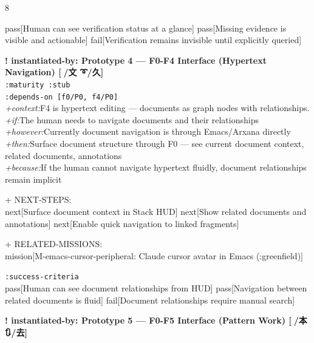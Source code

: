 \documentclass[landscape]{article}
\newcommand{\flexitag}[1]{\textcolor[gray]{0.35}{\textit{#1}}}
\newenvironment{devmapstub}{%
  \def\FrameCommand{\colorbox{devmapstubbg}}%
  \setlength{\fboxsep}{2pt}%
  \MakeFramed{\advance\hsize-\width \FrameRestore}%
}{\endMakeFramed}
\begin{document}
\begin{paracol}{8}
\begin{devmapstub}
    pass[Human can see verification status at a glance] pass[Missing evidence is visible and actionable] fail[Verification remains invisible until explicitly queried]\\
\par
\par
\end{devmapstub}
\begin{devmapstub}
\textbf{! instantiated-by: Prototype 4 — F0-F4 Interface (Hypertext Navigation) [📁/文 ➰/久]}\\
  \texttt{:\allowbreak{}maturity :\allowbreak{}stub}\\
  \texttt{:\allowbreak{}depends-\allowbreak{}on [f0/\allowbreak{}P0,\allowbreak{} f4/\allowbreak{}P0]}\\
  \flexitag{+context:}F4 is hypertext editing — documents as graph nodes with relationships.\\
  \flexitag{+if:}The human needs to navigate documents and their relationships\\
  \flexitag{+however:}Currently document navigation is through Emacs/Arxana directly\\
  \flexitag{+then:}Surface document structure through F0 — see current document context, related documents, annotations\\
  \flexitag{+because:}If the human cannot navigate hypertext fluidly, document relationships remain implicit\\
\par
  + NEXT-STEPS:\\
    next[Surface document context in Stack HUD] next[Show related documents and annotations] next[Enable quick navigation to linked fragments]\\
\par
  + RELATED-MISSIONS:\\
    mission[M-emacs-cursor-peripheral: Claude cursor avatar in Emacs (:greenfield)]\\
\par
  \texttt{:\allowbreak{}success-\allowbreak{}criteria}\\
    pass[Human can see document relationships from HUD] pass[Navigation between related documents is fluid] fail[Document relationships require manual search]\\
\par
\par
\end{devmapstub}
\begin{devmapstub}
\textbf{! instantiated-by: Prototype 5 — F0-F5 Interface (Pattern Work) [💎/本 🔃/去]}\\

\end{devmapstub}
\end{paracol}
\end{document}
